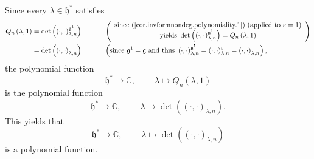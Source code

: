 \documentclass[etingof-lie.tex]{subfiles}
\begin{document}
Since every $\lambda\in\mathfrak{h}^{\ast}$ satisfies%
\begin{align*}
Q_{n}\left(  \lambda,1\right)   &  =\det\left(  \left(  \cdot,\cdot\right)
_{\lambda,n}^{\mathfrak{g}^{1}}\right)  \ \ \ \ \ \ \ \ \ \ \left(
\begin{array}
[c]{c}%
\text{since (\ref{cor.invformnondeg.polynomiality.1}) (applied to }%
\varepsilon=1\text{)}\\
\text{yields }\det\left(  \left(  \cdot,\cdot\right)  _{\lambda,n}%
^{\mathfrak{g}^{1}}\right)  =Q_{n}\left(  \lambda,1\right)
\end{array}
\right) \\
&  =\det\left(  \left(  \cdot,\cdot\right)  _{\lambda,n}\right)
\ \ \ \ \ \ \ \ \ \ \left(  \text{since }\mathfrak{g}^{1}=\mathfrak{g}\text{
and thus }\left(  \cdot,\cdot\right)  _{\lambda,n}^{\mathfrak{g}^{1}}=\left(
\cdot,\cdot\right)  _{\lambda,n}^{\mathfrak{g}}=\left(  \cdot,\cdot\right)
_{\lambda,n}\right)  ,
\end{align*}
the polynomial function%
\[
\mathfrak{h}^{\ast}\rightarrow\mathbb{C},\ \ \ \ \ \ \ \ \ \ \lambda\mapsto
Q_{n}\left(  \lambda,1\right)
\]
is the polynomial function%
\[
\mathfrak{h}^{\ast}\rightarrow\mathbb{C},\ \ \ \ \ \ \ \ \ \ \lambda
\mapsto\det\left(  \left(  \cdot,\cdot\right)  _{\lambda,n}\right)  .
\]
This yields that%
\[
\mathfrak{h}^{\ast}\rightarrow\mathbb{C},\ \ \ \ \ \ \ \ \ \ \lambda
\mapsto\det\left(  \left(  \cdot,\cdot\right)  _{\lambda,n}\right)
\]
is a polynomial function.
\end{document}
